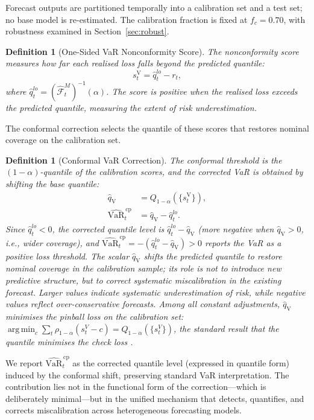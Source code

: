 \documentclass[preprint,11pt,authoryear]{elsarticle}
\DeclareMathOperator*{\argmin}{arg\,min}
\newtheorem{definition}[theorem]{Definition}
\newcommand{\VaR}{\mathrm{VaR}}
\newcommand{\1}{\boldsymbol{1}}
\newcommand{\qV}{\hat{q}_{\scriptscriptstyle\mathrm{V}}}
\newcommand{\Fhat}{\hat{\mathcal{F}}}
\begin{document}
	Forecast outputs are partitioned temporally into a calibration set and a test set; no base model is re-estimated. The
	calibration fraction is fixed at $f_c = 0.70$, with robustness examined in Section~\ref{sec:robust}.
	
	\begin{definition}[One-Sided VaR Nonconformity Score]
		\label{def:var_score}
		The nonconformity score measures how far each realised
		loss falls beyond the predicted quantile:
		\begin{equation}
			s_t^{\mathrm{V}} = \hat{q}_t^{lo} - r_t,
		\end{equation}
		where $\hat{q}_t^{lo} = (\Fhat_t^M)^{-1}(\alpha)$. The
		score is positive when the realised loss exceeds the
		predicted quantile, measuring the extent of risk
		underestimation.
	\end{definition}
	
	The conformal correction selects the quantile of these scores
	that restores nominal coverage on the calibration set.
	
	\begin{definition}[Conformal VaR Correction]
		\label{def:var_correction}
		The conformal threshold is the $(1-\alpha)$-quantile of
		the calibration scores, and the corrected VaR is obtained
		by shifting the base quantile:
		\begin{align}
			\qV &= Q_{1-\alpha}(\{s_t^{\mathrm{V}}\}), \\
			\widehat{\VaR}_t^{\,\mathrm{cp}}
			&= \qV - \hat{q}_t^{lo}.
		\end{align}
		Since $\hat{q}_t^{lo} < 0$, the corrected quantile level is $\hat{q}_t^{lo} - \qV$ (more negative when $\qV > 0$, i.e., wider coverage), and $\widehat{\VaR}_t^{\,\mathrm{cp}} = -(\hat{q}_t^{lo} - \qV) > 0$ reports the VaR as a positive loss threshold.
		The scalar $\qV$ shifts the predicted quantile to restore
		nominal coverage in the calibration sample; its role is not to introduce new predictive structure, but to correct systematic miscalibration in the existing forecast. Larger values indicate systematic
		underestimation of risk, while negative values reflect
		over-conservative forecasts. Among all constant
		adjustments, $\qV$ minimises the pinball loss on the
		calibration set: $\argmin_c \sum_t
		\rho_{1-\alpha}(s_t^V - c) = Q_{1-\alpha}(\{s_t^V\})$,
		the standard result that the quantile minimises the check
		loss \citep[Theorem~1.1]{koenker2005quantile}.
	\end{definition}

	We report $\widehat{\VaR}_t^{\,\mathrm{cp}}$ as the corrected quantile level (expressed in quantile form) induced by the conformal shift, preserving standard VaR interpretation.
	The contribution lies not in the functional form of the correction---which is deliberately minimal---but in the unified mechanism that detects, quantifies, and corrects miscalibration across heterogeneous forecasting models.
\end{document}
